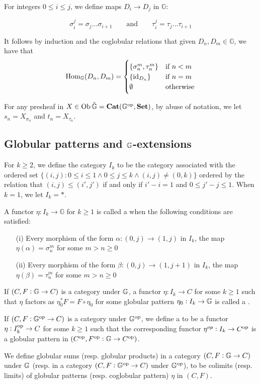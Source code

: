For integers \(0\leq i\leq j\), we define maps \(D_i\to D_j\) in \(\mathbb{G}\): 

\[\sigma^j_i=\sigma_j\hdots\sigma_{i+1}\qquad \text{and}\qquad\tau^j_i=\tau_j\hdots\tau_{i+1}\]

It follows by induction and the coglobular relations that given \(D_n, D_m\in \mathbb{G}\), we have that 
\[{\operatorname{Hom}}_\mathbb{G}(D_n,D_m)=
\begin{cases}\{\sigma_n^m,\tau_n^m\} & \text{if \(n<m\)}\\
\{\operatorname{id}_{D_n}\} & \text{if \(n=m\)}\\
\emptyset & \text{otherwise}\end{cases} \]

For any presheaf in \(X\in \operatorname{Ob}\hat{\mathbb{G}}={\operatorname{\mathbf{Cat}}}(\mathbb{G}^{\operatorname{op}},{\operatorname{\mathbf{Set}}})\), by abuse of notation, we let \(s_n=X_{\sigma_n}\) and \(t_n=X_{\tau_n}\).

\subsection{Globular patterns and $\mathbb{G}$-extensions}

For \(k\geq 2\), we define the category \(I_k\) to be the category associated with the ordered set \(\{(i,j): 0\leq i \leq 1 \wedge 0\leq j\leq k \wedge (i,j)\neq (0,k)\}\) ordered by the relation that \((i,j)\leq (i',j')\) if and only if \(i'-i=1\) and \(0\leq j'-j\leq 1\).  When \(k=1\), we let \(I_k=\ast\). 

\begin{defn}
A functor \(\eta:I_k\to \mathbb{G}\) for \(k\geq 1\) is called a  when the following conditions are satisfied:

\begin{enumerate}
\item [(i)] Every morphism of the form \(\alpha:(0,j)\to (1,j)\) in \(I_k\), the map \(\eta(\alpha)=\sigma_n^m\) for some \(m>n\geq 0\)
\item [(ii)] Every morphism of the form \(\beta:(0,j)\to (1,j+1)\) in \(I_k\), the map \(\eta(\beta)=\tau_n^m\) for some \(m>n\geq 0\)
\end{enumerate}

If \((C,F:\mathbb{G}\to C)\) is a category under \(\mathbb{G}\), a functor \(\eta:I_k\to C\) for some \(k\geq 1\) such that \(\eta\) factors as \(\eta_0^\ast F=F\circ \eta_0\) for some globular pattern \(\eta_0:I_k\to \mathbb{G}\) is called a .

If \((C,F:\mathbb{G}^{\operatorname{op}}\to C)\) is a category under \(\mathbb{G}^{\operatorname{op}}\), we define a  to be a functor \(\eta:I_k^{\operatorname{op}} \to C\) for some \(k\geq 1\) such that the corresponding functor \(\eta^{op}:I_k\to C^{\operatorname{op}}\) is a globular pattern in \((C^{\operatorname{op}},F^{\operatorname{op}}:\mathbb{G}\to C^{\operatorname{op}})\).

We define globular sums (resp. globular products) in a category \((C,F:\mathbb{G}\to C)\) under \(\mathbb{G}\) (resp. in a category \((C,F:\mathbb{G}^{\operatorname{op}}\to C)\) under \(\mathbb{G}^{\operatorname{op}}\)), to be colimits (resp. limits) of globular patterns (resp. coglobular pattern) \(\eta\) in \((C,F)\).  
\end{defn} 

